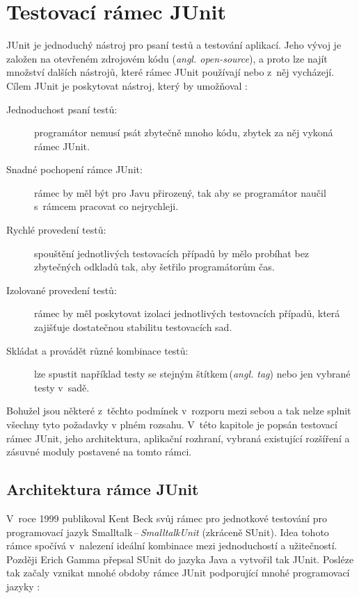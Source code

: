 \chapter{Testovací rámec JUnit}                                           %
JUnit je jednoduchý nástroj pro psaní testů a testování aplikací. Jeho vývoj je založen na otevřeném zdrojovém kódu (\emph{angl. open-source}), a proto lze najít množství dalších nástrojů, které rámec JUnit používají nebo z~něj vycházejí. Cílem JUnit je poskytovat nástroj, který by umožňoval \cite{JUnitGuide}:
\begin{description}
  \item[Jednoduchost psaní testů:]
  programátor nemusí psát zbytečně mnoho kódu, zbytek za něj vykoná rámec JUnit.
  \item[Snadné pochopení rámce JUnit:]
  rámec by měl být pro Javu přirozený, tak aby se programátor naučil s~rámcem pracovat co nejrychleji.
  \item[Rychlé provedení testů:]
  spouštění jednotlivých testovacích případů by mělo probíhat bez zbytečných odkladů tak, aby šetřilo programátorům čas.
  \item[Izolované provedení testů:]
  rámec by měl poskytovat izolaci jednotlivých testovacích případů, která zajišťuje dostatečnou stabilitu testovacích sad.
  \item[Skládat a provádět různé kombinace testů:]
  lze spustit například testy se stejným štítkem\,(\emph{angl. tag}) nebo jen vybrané testy v~sadě.
\end{description}

Bohužel jsou některé z~těchto podmínek v~rozporu mezi sebou a tak nelze splnit všechny tyto požadavky v plném rozsahu. V~této kapitole je popsán testovací rámec JUnit, jeho architektura, aplikační rozhraní, vybraná existující rozšíření a zásuvné moduly postavené na tomto rámci. 


  \section{Architektura rámce JUnit}
  V~roce 1999 publikoval Kent Beck svůj rámec pro jednotkové testování pro programovací jazyk Smalltalk\,--\,\emph{SmalltalkUnit} (zkráceně SUnit). Idea tohoto rámce spočívá v~nalezení ideální kombinace mezi jednoduchostí a užitečností. Později Erich Gamma přepsal SUnit do jazyka Java a vytvořil tak JUnit. Posléze tak začaly vznikat mnohé obdoby rámce JUnit podporující mnohé programovací jazyky \cite{UnitTestFrameworks}:

